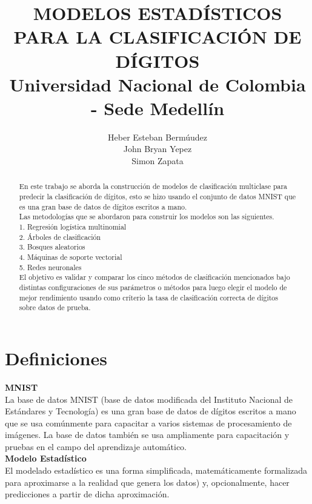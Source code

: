 \documentclass{article}
\begin{document}


\author{Heber Esteban Bermúudez \\
John Bryan Yepez \\
Simon Zapata}
\title{MODELOS ESTADÍSTICOS PARA LA CLASIFICACIÓN DE DÍGITOS \\
{\small Universidad Nacional de Colombia - Sede Medellín}}
\maketitle

\begin{abstract}
\noindent
En este trabajo se aborda la construcción de modelos de clasificación multiclase para predecir la clasificación de dígitos, esto se hizo usando el conjunto de datos MNIST que es una gran base de datos de dígitos escritos a mano.\\
Las metodologías que se abordaron para construir los modelos son las siguientes. \\
1. Regresión logística multinomial\\
2. Árboles de clasificación\\
3. Bosques aleatorios\\
4. Máquinas de soporte vectorial\\
5. Redes neuronales\\
El objetivo es validar y comparar los cinco métodos de clasificación mencionados bajo distintas configuraciones de sus parámetros o métodos para luego elegir el modelo de mejor rendimiento usando como críterio la tasa de clasificación correcta de dígitos sobre datos de prueba.
\end{abstract}


\section{Definiciones}

\textbf{MNIST}\\
La base de datos MNIST (base de datos modificada del Instituto Nacional de Estándares y Tecnología) es una gran base de datos de dígitos escritos a mano que se usa comúnmente para capacitar a varios sistemas de procesamiento de imágenes. La base de datos también se usa ampliamente para capacitación y pruebas en el campo del aprendizaje automático.\\

\textbf{Modelo Estadístico}\\
El modelado estadístico es una forma simplificada, matemáticamente formalizada para aproximarse a la realidad que genera los datos) y, opcionalmente, hacer predicciones a partir de dicha aproximación.
\end{document}
